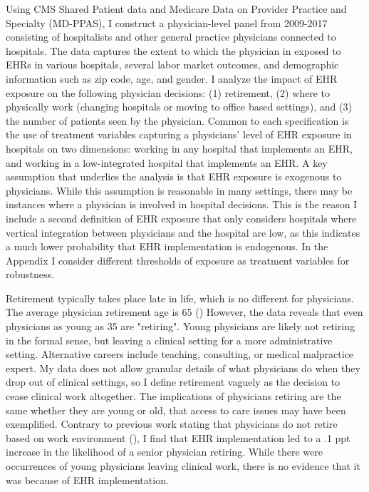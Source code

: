 \documentclass[11pt]{article}
\begin{document}
Using CMS Shared Patient data and Medicare Data on Provider Practice and Specialty (MD-PPAS), I construct a physician-level panel from 2009-2017 consisting of hospitalists and other general practice physicians connected to hospitals. The data captures the extent to which the physician in exposed to EHRs in various hospitals, several labor market outcomes, and demographic information such as zip code, age, and gender. I analyze the impact of EHR exposure on the following physician decisions: (1) retirement, (2) where to physically work (changing hospitals or moving to office based settings), and (3) the number of patients seen by the physician. Common to each specification is the use of treatment variables capturing a physicians' level of EHR exposure in hospitals on two dimensions: working in any hospital that implements an EHR, and working in a low-integrated hospital that implements an EHR. A key assumption that underlies the analysis is that EHR exposure is exogenous to physicians. While this assumption is reasonable in many settings, there may be instances where a physician is involved in hospital decisions. This is the reason I include a second definition of EHR exposure that only considers hospitals where vertical integration between physicians and the hospital are low, as this indicates a much lower probability that EHR implementation is endogenous. In the Appendix I consider different thresholds of exposure as treatment variables for robustness. 

Retirement typically takes place late in life, which is no different for physicians. The average physician retirement age is 65 (\cite{collier2017challenges}) However, the data reveals that even physicians as young as 35 are "retiring". Young physicians are likely not retiring in the formal sense, but leaving a clinical setting for a more administrative setting. Alternative careers include teaching, consulting, or medical malpractice expert. My data does not allow granular details of what physicians do when they drop out of clinical settings, so I define retirement vaguely as the decision to cease clinical work altogether. The implications of physicians retiring are the same whether they are young or old, that access to care issues may have been exemplified. Contrary to previous work stating that physicians do not retire based on work environment (\cite{Bahrami2002}), I find that EHR implementation led to a .1 ppt increase in the likelihood of a senior physician retiring. While there were occurrences of young physicians leaving clinical work, there is no evidence that it was because of EHR implementation.
\end{document}

